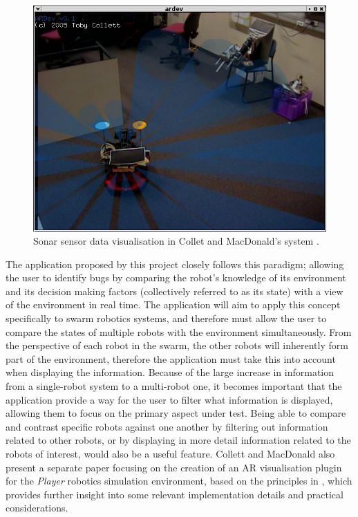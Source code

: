\documentclass[titlepage,hidelinks,10pt]{article}
\begin{document}
\begin{figure}[H]
	\begin{center}
	\includegraphics[scale=0.6]{Sonar.png}
	\caption{Sonar sensor data visualisation in Collet and MacDonald's system \cite{AugmentedRealityDebuggingSystem}.}
	\label{fig:Sonar}
	\end{center}
\end{figure}

The application proposed by this project closely follows this paradigm; allowing the user to identify bugs by comparing the robot's knowledge of its environment and its decision making factors (collectively referred to as its state) with a view of the environment in real time. The application will aim to apply this concept specifically to swarm robotics systems, and therefore must allow the user to compare the states of multiple robots with the environment simultaneously. From the perspective of each robot in the swarm, the other robots will inherently form part of the environment, therefore the application must take this into account when displaying the information. Because of the large increase in information from a single-robot system to a multi-robot one, it becomes important that the application provide a way for the user to filter what information is displayed, allowing them to focus on the primary aspect under test. Being able to compare and contrast specific robots against one another by filtering out information related to other robots, or by displaying in more detail information related to the robots of interest, would also be a useful feature. Collett and MacDonald also present a separate paper \cite{ARForPlayer} focusing on the creation of an AR visualisation plugin for the \textit{Player} \cite{Player} robotics simulation environment, based on the principles in  \cite{AugmentedRealityDebuggingSystem}, which provides further insight into some relevant implementation details and practical considerations.
\end{document}
